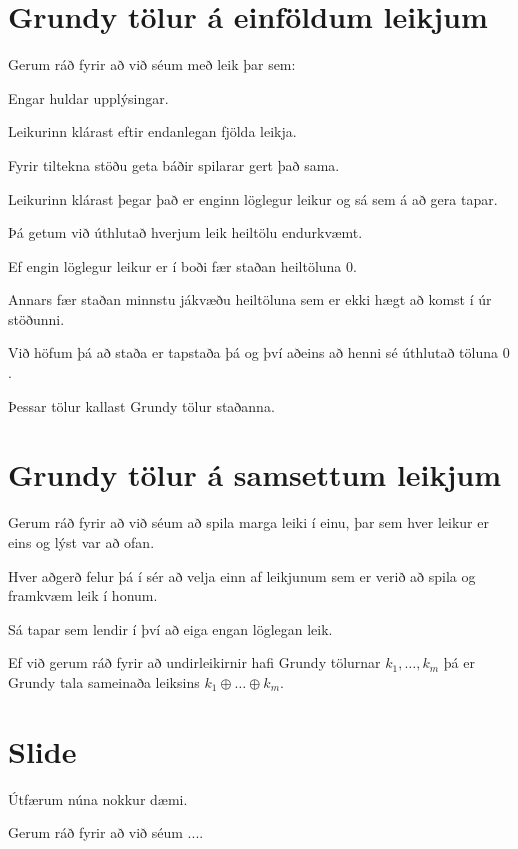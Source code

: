 \section{Grundy tölur á einföldum leikjum}
{
    {
        \item<1-> Gerum ráð fyrir að við séum með leik þar sem:
        {
            \item<1-> Engar huldar upplýsingar.
            \item<1-> Leikurinn klárast eftir endanlegan fjölda leikja.
            \item<1-> Fyrir tiltekna stöðu geta báðir spilarar gert það sama.
            \item<1-> Leikurinn klárast þegar það er enginn löglegur leikur og sá sem á að gera tapar.
        }
        \item<2-> Þá getum við úthlutað hverjum leik heiltölu endurkvæmt.
        \item<3-> Ef engin löglegur leikur er í boði fær staðan heiltöluna $0$.
        \item<4-> Annars fær staðan minnstu jákvæðu heiltöluna sem er ekki hægt að komst í úr stöðunni.
        \item<5-> Við höfum þá að staða er tapstaða þá og því aðeins að henni sé úthlutað töluna $0$.
        \item<6-> Þessar tölur kallast Grundy tölur staðanna.
    }
}

\section{Grundy tölur á samsettum leikjum}
{
    {
        \item<1-> Gerum ráð fyrir að við séum að spila marga leiki í einu, þar sem hver leikur er eins og lýst var að ofan.
        \item<2-> Hver aðgerð felur þá í sér að velja einn af leikjunum sem er verið að spila og framkvæm leik í honum.
        \item<3-> Sá tapar sem lendir í því að eiga engan löglegan leik.
        \item<4-> Ef við gerum ráð fyrir að undirleikirnir hafi Grundy tölurnar $k_1, \dots, k_m$ þá er Grundy tala sameinaða leiksins
                    $k_1 \oplus \dots \oplus k_m$.
    }
}

\section{Slide}
{
    {
        \item<1-> Útfærum núna nokkur dæmi.
        \item<2-> Gerum ráð fyrir að við séum ....
    }
}

